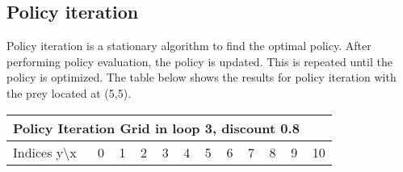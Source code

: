 \documentclass{article}
\begin{document}
\subsection*{Policy iteration}
Policy iteration is a stationary algorithm to find the optimal policy. After performing policy evaluation, the policy is updated. This is repeated until the policy is optimized. The table below shows the results for policy iteration with the prey located at (5,5).
\begin{center}
\scalebox{0.6}
	{
		\begin{tabular}{ |l | l | l | l | l | l | l | l | l | l | l | l|}
		\hline
		\multicolumn{11}{|c|}{Policy Iteration Grid  in loop 3, discount 0.8}\\
		\hline
		Indices y\textbackslash x &0 & 1 & 2 & 3 & 4 & 5 & 6 & 7 & 8 & 9 & 10 \\ 


\end{tabular}}
\end{center}
\end{document}
